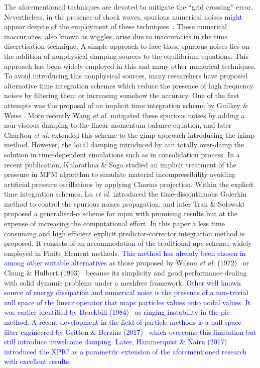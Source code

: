 \documentclass[preprint,12pt,a4paper]{elsarticle}
\begin{document}
The aforementioned techniques are devoted to mitigate the
``grid crossing'' error. Nevertheless, in the presence of shock waves, spurious
numerical noises \textcolor{blue}{might} appear despite of the employment of these techniques~\cite{Tran2019e}. These numerical inaccuracies, also known
as wiggles, arise due to inaccuracies in the time discretisation technique.
A simple approach to face those spurious noises lies on the addition of nonphysical damping sources to the equilibrium equations. This
approach has been widely employed in this and many other numerical
techniques. To avoid introducing this nonphysical sources, many
researchers have proposed alternative time integration
schemes which reduce the presence of high frequency noises by
filtering them or increasing somehow the accuracy. One of the first attempts was the proposal of an implicit time integration scheme by Guilkey \& Weiss \cite{Guilkey_2003}. More recently Wang {\it et al.}
\cite{Wang_2016} mitigated these spurious noises by adding a non-viscous
damping to the linear momentum balance equation, and later Charlton
{\it et al.} \cite{Charlton_2017} extended this scheme to the
\acrshort{gimp} approach introducing the \acrfull{igimp}
method. However, the local damping introduced by 
\cite{Wang_2016} can totally over-damp the solution in time-dependent
simulations such as in consolidation process. In a recent publication,
Kularathna \& Soga \cite{Soga_2017} studied an implicit treatment of the pressure in MPM algorithm to simulate material incompressibility
avoiding artificial pressure oscillations by applying
Chorin\textquotesingle s
projection. Within the explicit time integration schemes, Lu {\it et al.}\cite{LU_2018} introduced the time-discontinuous Galerkin method to control the spurious noises
propagation, and later Tran \& Solowski~\cite{Tran2019e}
proposed a generalised-$\alpha$ scheme for \acrshort{mpm} with
promising results but at the expense of increasing the computational
effort. In this paper a less time consuming and high efficient explicit predictor-corrector integration method is
proposed. It consists of an accommodation of the traditional \acrfull{npc} scheme, widely employed in Finite Element methods. \textcolor{blue}{This method
has already been chosen in ~\cite{Navas2018a} among other suitable alternatives} as those proposed
by Wilson {\it et al.} (1972)~\cite{Wilson1972} or Chung \& Hulbert
(1993)~\cite{Geranlized_alpha_1993} because its simplicity and good
performance dealing with solid dynamic problems under a meshfree
framework.  
\textcolor{blue}{Other well known source of energy dissipation and numerical noise is the presence of a non-trivial null space of the linear operator that maps particles values onto nodal values. It was earlier identified by Brackbill (1984)~\cite{BRACKBILL1988469} as ringing instability in the \acrfull{pic} method. A recent development in the field of particle methods is a null-space filter engineered by Gritton \&
Berzins (2017)~\cite{Gritton2017} which overcome this limitation but still introduce unwelcome damping.  Later, Hammerquist \& Nairn (2017)~\cite{HAMMERQUIST2017724} introduced the XPIC as a parametric extension of the aforementioned research with excellent results.}
\end{document}
